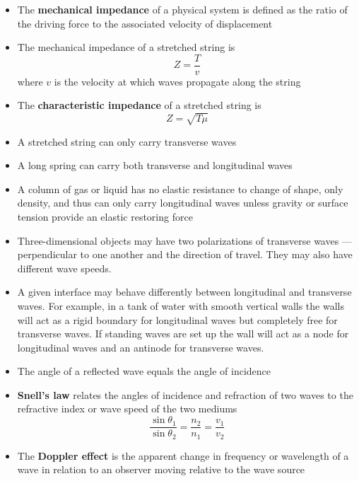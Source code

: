 \documentclass{article}
\begin{document}
\begin{itemize}
  \item The \textbf{mechanical impedance} of a physical system is defined as the ratio of the driving force to the associated velocity of displacement

  \item The mechanical impedance of a stretched string is \[Z = \frac{T}{v}\] where $v$ is the velocity at which waves propagate along the string

  \item The \textbf{characteristic impedance} of a stretched string is \[Z = \sqrt{T \mu}\]

  \item A stretched string can only carry transverse waves

  \item A long spring can carry both transverse and longitudinal waves

  \item A column of gas or liquid has no elastic resistance to change of shape, only density, and thus can only carry longitudinal waves unless gravity or surface tension provide an elastic restoring force

  \item Three-dimensional objects may have two polarizations of transverse waves — perpendicular to one another and the direction of travel. They may also have different wave speeds.

  \item A given interface may behave differently between longitudinal and transverse waves. For example, in a tank of water with smooth vertical walls the walls will act as a rigid boundary for longitudinal waves but completely free for transverse waves. If standing waves are set up the wall will act as a node for longitudinal waves and an antinode for transverse waves.

  \item The angle of a reflected wave equals the angle of incidence

  \item \textbf{Snell's law} relates the angles of incidence and refraction of two waves to the refractive index or wave speed of the two mediums \[\frac{\sin \theta_1}{\sin \theta_2} = \frac{n_2}{n_1} = \frac{v_1}{v_2}\]

  \item The \textbf{Doppler effect} is the apparent change in frequency or wavelength of a wave in relation to an observer moving relative to the wave source


\end{itemize}
\end{document}
